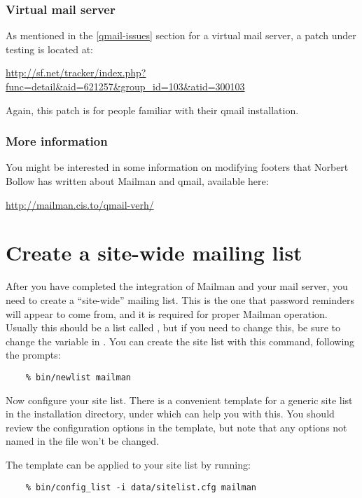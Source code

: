 \documentclass{howto}
\begin{document}
\subsubsection{Virtual mail server}

As mentioned in the \ref{qmail-issues} section for a virtual mail server, a
patch under testing is located at:

\url{http://sf.net/tracker/index.php?func=detail\&aid=621257\&group_id=103\&atid=300103}

Again, this patch is for people familiar with their qmail installation.

\subsubsection{More information}

You might be interested in some information on modifying footers that Norbert
Bollow has written about Mailman and qmail, available here:

    \url{http://mailman.cis.to/qmail-verh/}

\section{Create a site-wide mailing list}

After you have completed the integration of Mailman and your mail server, you
need to create a ``site-wide'' mailing list.  This is the one that password
reminders will appear to come from, and it is required for proper Mailman
operation.  Usually this should be a list called , but if you
need to change this, be sure to change the  variable in
.  You can create the site list with this command, following
the prompts:

\begin{verbatim}
    % bin/newlist mailman
\end{verbatim}

Now configure your site list.  There is a convenient template for a generic
site list in the installation directory, under  which
can help you with this.  You should review the configuration options in the
template, but note that any options not named in the  file
won't be changed.

The template can be applied to your site list by
running:

\begin{verbatim}
    % bin/config_list -i data/sitelist.cfg mailman
\end{verbatim}
\end{document}
